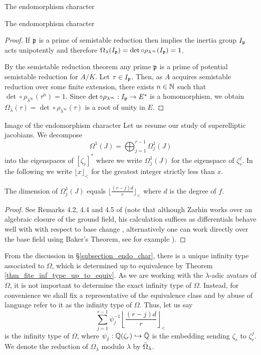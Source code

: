 \documentclass[11pt,a4paper]{article}
\newcommand{\lam}{\lambda}
\newcommand{\Qr}{{\QQ(\zeta_r)}}
\newcommand{\zr}{\zeta_r}
\begin{document}
\begin{section}{The endomorphism character}
\begin{subsection}{The endomorphism character}
\begin{proof}
If $\mathfrak{p}$ is a prime of semistable reduction then \cite[Proposition 3.5]{SGA7} \cite[Page 184, Thm 6]{Neron_models_BLR_book} implies the inertia group $I_{\mathfrak{p}}$ acts unipotently and therefore $\Omega_\lambda(I_\p) = \det \circ \rho_{\lam^\infty}(I_\p)=1$.


By the semistable reduction theorem \cite{SGA7} any prime $\mathfrak{p}$ is a prime of potential semistable reduction for $A/K$. Let $\tau\in I_{\mathfrak{p}}$. Then, as $A$ acquires semistable reduction over some finite extension, there exists $n \in \mathbb{N}$ such that $\det \circ \rho_{\lam^\infty}(\tau^n)=1$. Since $\det \circ \rho_{\lam^\infty}: I_\p \rightarrow E^*$ is a homomorphism, we obtain $\Omega_\lam (\tau) =\det \circ \rho_{\lam^\infty}(\tau)$ is a root of unity in $E$.
\end{proof}
\end{subsection}
\begin{subsection}{Image of the endomorphism character}
Let us resume our study of superelliptic jacobians. 
We decompose
\[\Omega^1(J) = \bigoplus_{j=1}^{r-1} \Omega^1_j(J)\] into the eigenspaces of $[\zr]^*$ where we write $\Omega^1_j(J)$ for the eigenspace of $\zr^j$.
In the following we write $\lfloor x \rfloor_< $ for the greatest integer strictly less than $x$.

\begin{lemma}
    The dimension of $\Omega^1_j(J)$ equals $\lfloor \frac{(r-j)d}{r} \rfloor_< $ where $d$ is the degree of $f$.
\end{lemma}

\begin{proof}
See Remarks 4.2, 4.4 and 4.5 of \cite{Zarhin} (note that although Zarhin works over an algebraic closure of the ground field, his calculation suffices as differentials behave well with with respect to base change \cite[Lemma 5.2.26]{Liu}, alternatively one can work directly over the base field using Baker's Theorem, see for example \cite[Theorem 2.2]{Models_Curves_DVR}).
\end{proof}

From the discussion in \S \ref{subsection_endo_char}, there is a unique infinity type associated to $\Omega$, which is determined up to equivalence by Theorem \ref{thm_fite_inf_type_up_to_equiv}.
As we are working with the $\lambda$-adic avatars of $\Omega$, it is not important to determine the exact infinity type of $\Omega$.
Instead, for convenience we shall fix a representative of the equivalence class and by abuse of language refer to it as the infinity type of $\Omega$.
Thus, let us say
\[ \sum_{j=1}^{r-1} \psi_j^{-1}{\left\lfloor \frac{(r-j)d}{r} \right\rfloor_<}
\]
is the infinity type of $\Omega$, where $\psi_j^{}:\Qr \hookrightarrow \Bar{\QQ}$ is the embedding sending $\zr$ to $\zr^{j}$. We denote the reduction of $\Omega_{\lambda}$ modulo $\lambda$ by $\Bar{\Omega}_{\lambda}$.




\end{subsection}
\end{section}
\end{document}
